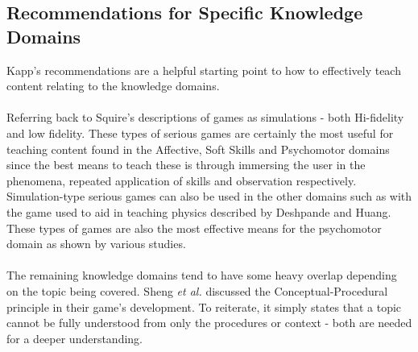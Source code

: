 \documentclass[conference]{IEEEtran}
\begin{document}
\subsection{Recommendations for Specific Knowledge Domains}
Kapp's\cite{Kapp2012a} recommendations are a helpful starting point to how to effectively teach content relating to the knowledge domains. 
\\\\
Referring back to Squire's\cite{Squire2003} descriptions of games as simulations - both Hi-fidelity and low fidelity. These types of serious games are certainly the most useful for teaching content found in the Affective, Soft Skills and Psychomotor domains since the best means to teach these is through immersing the user in the phenomena, repeated application of skills and observation respectively\cite{Kapp2012a}. Simulation-type serious games can also be used in the other domains such as with the game used to aid in teaching physics described by Deshpande and Huang\cite{Deshpande2011}. These types of games are also the most effective means for the psychomotor domain as shown by various studies\cite{Burke2009, Costanza2014, Ranalli2008, Tao2009}.
\\\\
The remaining knowledge domains tend to have some heavy overlap depending on the topic being covered. Sheng \textit{et al.}\cite{Sheng2007} discussed the Conceptual-Procedural principle in their game's development. To reiterate, it simply states that a topic cannot be fully understood from only the procedures or context - both are needed for a deeper understanding.
\end{document}
